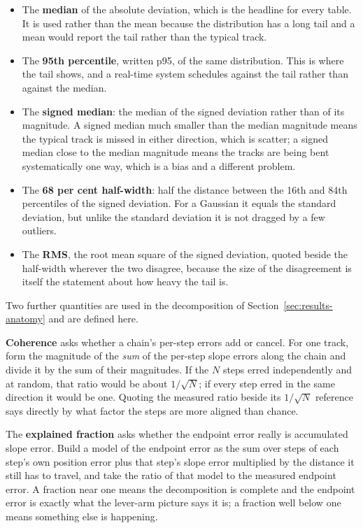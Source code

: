 \documentclass[11pt,a4paper]{article}
\begin{document}
\begin{itemize}
  \item The \textbf{median} of the absolute deviation, which is the headline
  for every table. It is used rather than the mean because the distribution has
  a long tail and a mean would report the tail rather than the typical track.
  \item The \textbf{95th percentile}, written p95, of the same distribution.
  This is where the tail shows, and a real-time system schedules against the
  tail rather than against the median.
  \item The \textbf{signed median}: the median of the signed deviation rather
  than of its magnitude. A signed median much smaller than the median magnitude
  means the typical track is missed in either direction, which is scatter; a
  signed median close to the median magnitude means the tracks are being bent
  systematically one way, which is a bias and a different problem.
  \item The \textbf{68 per cent half-width}: half the distance between the
  16th and 84th percentiles of the signed deviation. For a Gaussian it equals
  the standard deviation, but unlike the standard deviation it is not dragged
  by a few outliers.
  \item The \textbf{RMS}, the root mean square of the signed deviation, quoted
  beside the half-width wherever the two disagree, because the size of the
  disagreement is itself the statement about how heavy the tail is.
\end{itemize}

Two further quantities are used in the decomposition of
Section~\ref{sec:results-anatomy} and are defined here.

\textbf{Coherence} asks whether a chain's per-step errors add or cancel. For
one track, form the magnitude of the \emph{sum} of the per-step slope errors
along the chain and divide it by the sum of their magnitudes. If the $N$ steps
erred independently and at random, that ratio would be about $1/\sqrt{N}$; if
every step erred in the same direction it would be one. Quoting the measured
ratio beside its $1/\sqrt{N}$ reference says directly by what factor the steps
are more aligned than chance.

The \textbf{explained fraction} asks whether the endpoint error really is
accumulated slope error. Build a model of the endpoint error as the sum over
steps of each step's own position error plus that step's slope error multiplied
by the distance it still has to travel, and take the ratio of that model to the
measured endpoint error. A fraction near one means the decomposition is
complete and the endpoint error is exactly what the lever-arm picture says it
is; a fraction well below one means something else is happening.
\end{document}
